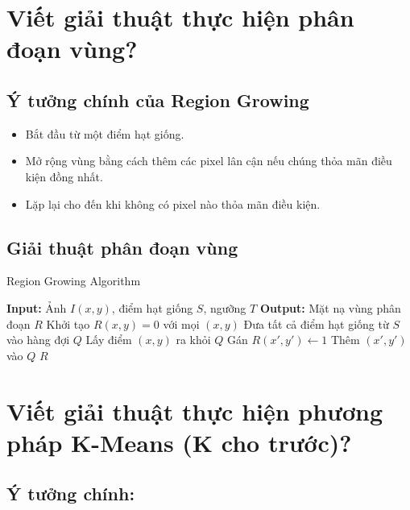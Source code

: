 \documentclass[12pt]{article}
\begin{document}
	
	
	\section{Viết giải thuật thực hiện phân đoạn vùng?}
	
	\subsection*{Ý tưởng chính của Region Growing}
	
	\begin{itemize}
	\item Bắt đầu từ một điểm hạt giống.
	\item Mở rộng vùng bằng cách thêm các pixel lân cận nếu chúng thỏa mãn điều kiện đồng nhất.
	\item Lặp lại cho đến khi không có pixel nào thỏa mãn điều kiện.
	\end{itemize}
	
	\subsection*{Giải thuật phân đoạn vùng}
	
	\begin{algorithm}[H]
	\caption{Region Growing Algorithm}
	\begin{algorithmic}[1]
	\State \textbf{Input:} Ảnh $I(x, y)$, điểm hạt giống $S$, ngưỡng $T$
	\State \textbf{Output:} Mặt nạ vùng phân đoạn $R$
	\State Khởi tạo $R(x, y) = 0$ với mọi $(x, y)$
	\State Đưa tất cả điểm hạt giống từ $S$ vào hàng đợi $Q$
	\State Lấy điểm $(x, y)$ ra khỏi $Q$
	\State Gán $R(x', y') \gets 1$
	\State Thêm $(x', y')$ vào $Q$
	\EndIf
	\EndFor
	\EndWhile
	\State \Return $R$
	\end{algorithmic}
	\end{algorithm}
	
	\section{Viết giải thuật thực hiện phương pháp K-Means (K cho trước)?}
	
	\subsection*{Ý tưởng chính:}
	
\end{document}
